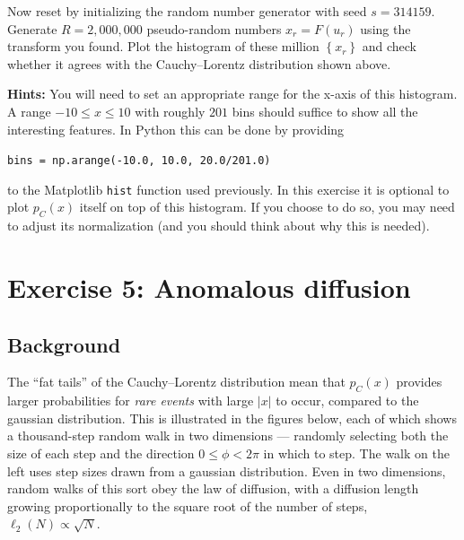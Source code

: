 \documentclass[12 pt]{article} %
\newcommand{\showmarks}[1]{\rightline{\texttt{[#1 marks]}}} %
\begin{document}
\showmarks{6}

Now reset by initializing the random number generator with seed $s = 314159$.
Generate $R = 2{,}000{,}000$ pseudo-random numbers $x_r = F(u_r)$ using the transform you found.
Plot the histogram of these million $\left\{x_r\right\}$ and check whether it agrees with the Cauchy--Lorentz distribution shown above.

\textbf{Hints:} You will need to set an appropriate range for the x-axis of this histogram.
A range $-10 \leq x \leq 10$ with roughly $201$ bins should suffice to show all the interesting features.
In Python this can be done by providing \\
\centerline{\texttt{bins = np.arange(-10.0, 10.0, 20.0/201.0)}}
to the Matplotlib \texttt{hist} function used previously.
In this exercise it is optional to plot $p_C(x)$ itself on top of this histogram.
If you choose to do so, you may need to adjust its normalization (and you should think about why this is needed).

\showmarks{8}



\newpage %
\section*{Exercise 5: Anomalous diffusion}
\subsection*{Background}
The ``fat tails'' of the Cauchy--Lorentz distribution mean that $p_C(x)$ provides larger probabilities for \textit{rare events} with large $|x|$ to occur, compared to the gaussian distribution.
This is illustrated in the figures below, each of which shows a thousand-step random walk in two dimensions --- randomly selecting both the size of each step and the direction $0 \leq \phi < 2\pi$ in which to step.
The walk on the left uses step sizes drawn from a gaussian distribution.
Even in two dimensions, random walks of this sort obey the law of diffusion, with a diffusion length growing proportionally to the square root of the number of steps, $\ell_2(N) \propto \sqrt{N}$.
\end{document}
